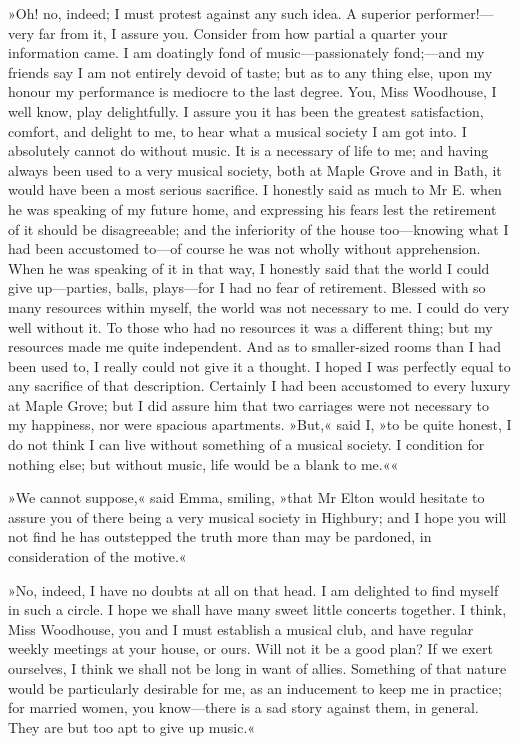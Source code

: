 »Oh! no, indeed; I must protest against any such idea. A superior performer!—very far from it, I assure you. Consider from how partial a quarter your information came. I am doatingly fond of music—passionately fond;—and my friends say I am not entirely devoid of taste; but as to any thing else, upon my honour my performance is mediocre to the last degree. You, Miss Woodhouse, I well know, play delightfully. I assure you it has been the greatest satisfaction, comfort, and delight to me, to hear what a musical society I am got into. I absolutely cannot do without music. It is a necessary of life to me; and having always been used to a very musical society, both at Maple Grove and in Bath, it would have been a most serious sacrifice. I honestly said as much to Mr E. when he was speaking of my future home, and expressing his fears lest the retirement of it should be disagreeable; and the inferiority of the house too—knowing what I had been accustomed to—of course he was not wholly without apprehension. When he was speaking of it in that way, I honestly said that the world I could give up—parties, balls, plays—for I had no fear of retirement. Blessed with so many resources within myself, the world was not necessary to me. I could do very well without it. To those who had no resources it was a different thing; but my resources made me quite independent. And as to smaller-sized rooms than I had been used to, I really could not give it a thought. I hoped I was perfectly equal to any sacrifice of that description. Certainly I had been accustomed to every luxury at Maple Grove; but I did assure him that two carriages were not necessary to my happiness, nor were spacious apartments. »But,« said I, »to be quite honest, I do not think I can live without something of a musical society. I condition for nothing else; but without music, life would be a blank to me.««

»We cannot suppose,« said Emma, smiling, »that Mr Elton would hesitate to assure you of there being a very musical society in Highbury; and I hope you will not find he has outstepped the truth more than may be pardoned, in consideration of the motive.«

»No, indeed, I have no doubts at all on that head. I am delighted to find myself in such a circle. I hope we shall have many sweet little concerts together. I think, Miss Woodhouse, you and I must establish a musical club, and have regular weekly meetings at your house, or ours. Will not it be a good plan? If we exert ourselves, I think we shall not be long in want of allies. Something of that nature would be particularly desirable for me, as an inducement to keep me in practice; for married women, you know—there is a sad story against them, in general. They are but too apt to give up music.«

